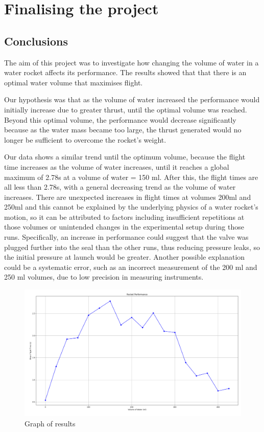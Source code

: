 \documentclass[14pt]{article}
\begin{document}
\section{Finalising the project}
\subsection{Conclusions}

The aim of this project was to investigate how changing the volume of water in a water rocket affects its performance. The results showed that that there is an optimal water volume that maximises flight. 

Our hypothesis was that as the volume of water increased the performance would initially increase due to greater thrust, until the optimal volume was reached. Beyond this optimal volume, the performance would decrease significantly because as the water mass became too large, the thrust generated would no longer be sufficient to overcome the rocket’s weight.

Our data shows a similar trend until the optimum volume, because the flight time increases as the volume of water increases, until it reaches a global maximum of 2.78s at a volume of water = 150 ml. After this, the flight times are all less than 2.78s, with a general decreasing trend as the volume of water increases. There are unexpected increases in flight times at volumes 200ml and 250ml and this cannot be explained by the underlying physics of a water rocket's motion, so it can be attributed to factors including insufficient repetitions at those volumes or unintended changes in the experimental setup during those runs. Specifically, an increase in performance could suggest that the valve was plugged further into the seal than the other runs, thus reducing pressure leaks, so the initial pressure at launch would be greater. Another possible explanation could be a systematic error, such as an incorrect measurement of the 200 ml and 250 ml volumes, due to low precision in measuring instruments.
\begin{figure}[h]
    \centering
    \includegraphics[width=\textwidth]{graph.png}
    \caption{Graph of results}
\end{figure}
\FloatBarrier
\end{document}
